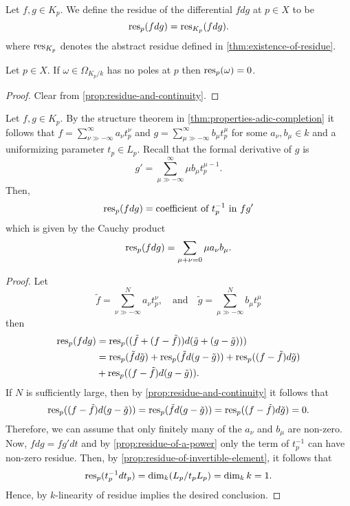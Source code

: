\begin{definition}\label{def:residue-at-p}
	Let $f,g \in K_{p}$. We define the residue of the differential $fdg$ at $p\in X$ to be
	\[
		\operatorname{res}_{p}(fdg) = \operatorname{res}_{K_{p}}(fdg).
	\]
	where $\operatorname{res}_{K_{p}}$ denotes the abstract residue defined in \cref{thm:existence-of-residue}.
\end{definition} 
\begin{proposition}\label{prop:no-poles-zero-residue}
	Let $p\in X$. If $\omega \in \Omega_{K_{p}/k}$ has no poles at $p$ then $\operatorname{res}_{p}(\omega) = 0$.
\end{proposition}
\begin{proof}
	Clear from \cref{prop:residue-and-continuity}.
\end{proof}

\begin{theorem}\label{thm:resiude-coincides-with-coefficient}
	Let $f,g \in K_{p}$. By the structure theorem in \cref{thm:properties-adic-completion} it follows that $f = \sum_{\nu \gg -\infty}^{\infty} a_{\nu}t_{p}^{\nu}$ and $g = \sum_{\mu \gg -\infty}^{\infty} b_{\mu}t_{p}^{\mu}$ for some $a_{\nu},b_{\mu} \in k$ and a uniformizing parameter $t_{p}\in L_{p} $. Recall that the formal derivative of $g$ is
	\[
		g' = \sum_{\mu \gg -\infty}^{\infty} \mu b_{\mu}t_{p}^{\mu -1}.
	\]
	Then,
	\[
		\operatorname{res}_{p}(fdg) = \text{coefficient of }t_{p}^{-1}\text{ in } fg'
	\]
	which is given by the Cauchy product
	\[
		\operatorname{res}_{p}(fdg) = \sum_{\mu + \nu = 0}\mu a_\nu{}b_{\mu}.
	\]
\end{theorem}
\begin{proof}
	Let
	\[
		\tilde{f} = \sum_{\nu\gg-\infty}^{N} a_{\nu}t_{p}^{\nu},\quad\text{and}\quad\tilde{g} = \sum_{\mu\gg-\infty}^{N} b_{\mu}t_{p}^{\mu}
	\]
	then 
	\begin{align*}
		\operatorname{res}_{p}(fdg) &= \operatorname{res}_{p}( (\tilde{f} + (f - \tilde{f}))d(\tilde{g} + (g - \tilde{g}))) \\
		&= \operatorname{res}_{p}(\tilde{f}d\tilde{g}) + \operatorname{res}_{p}(\tilde{f}d(g - \tilde{g})) + \operatorname{res}_{p}((f-\tilde{f}) d\tilde{g}) \\ &+ \operatorname{res}_{p}( (f - \tilde{f})d(g-\tilde{g})).
	\end{align*}
	If $N$ is sufficiently large, then by \cref{prop:residue-and-continuity} it follows that 
	\[
		\operatorname{res}_{p}( (f - \tilde{f})d(g-\tilde{g})) = \operatorname{res}_{p}(\tilde{f}d(g - \tilde{g})) = \operatorname{res}_{p}((f-\tilde{f}) d\tilde{g}) = 0.
	\]
	Therefore, we can assume that only finitely many of the $a_{\nu}$ and $b_{\mu}$ are non-zero. Now, $fdg = f g' dt$ and by \cref{prop:residue-of-a-power} only the term of $t_{p}^{-1}$ can have non-zero residue. Then, by \cref{prop:residue-of-invertible-element}, it follows that
	\[
		\operatorname{res}_{p}(t_{p}^{-1}dt_{p}) = \dim_{k}(L_{p}/t_{p}L_{p}) = \dim_{k}k = 1. 	
	\]
	Hence, by $k$-linearity of residue implies the desired conclusion.
\end{proof}
